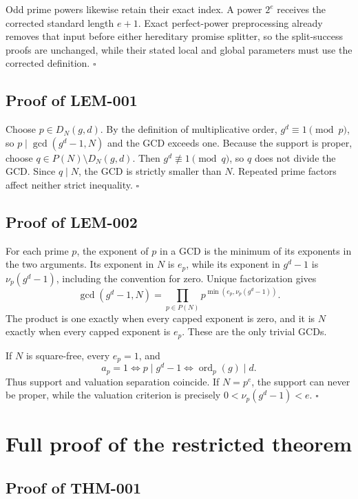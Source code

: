 \documentclass[11pt]{article}
\begin{document}
Odd prime powers likewise retain their exact index. A power \(2^e\) receives
the corrected standard length \(e+1\). Exact perfect-power preprocessing
already removes that input before either hereditary promise splitter, so the
split-success proofs are unchanged, while their stated local and global
parameters must use the corrected definition. \(\square\)

\subsection{Proof of LEM-001}\label{proof:LEM-001}

Choose \(p\in D_N(g,d)\). By the definition of multiplicative order,
\(g^d\equiv1\pmod p\), so \(p\mid\gcd(g^d-1,N)\) and the GCD exceeds one.
Because the support is proper, choose
\(q\in P(N)\setminus D_N(g,d)\). Then
\(g^d\not\equiv1\pmod q\), so \(q\) does not divide the GCD. Since \(q\mid N\),
the GCD is strictly smaller than \(N\). Repeated prime factors affect neither
strict inequality. \(\square\)

\subsection{Proof of LEM-002}\label{proof:LEM-002}

For each prime \(p\), the exponent of \(p\) in a GCD is the minimum of its
exponents in the two arguments. Its exponent in \(N\) is \(e_p\), while its
exponent in \(g^d-1\) is \(\nu_p(g^d-1)\), including the convention for zero.
Unique factorization gives
\[
\gcd(g^d-1,N)=
\prod_{p\in P(N)}p^{\min(e_p,\nu_p(g^d-1))}.
\]
The product is one exactly when every capped exponent is zero, and it is \(N\)
exactly when every capped exponent is \(e_p\). These are the only trivial
GCDs.

If \(N\) is square-free, every \(e_p=1\), and
\[
a_p=1
\Longleftrightarrow p\mid g^d-1
\Longleftrightarrow\operatorname{ord}_p(g)\mid d.
\]
Thus support and valuation separation coincide. If \(N=p^e\), the support can
never be proper, while the valuation criterion is precisely
\(0<\nu_p(g^d-1)<e\). \(\square\)

\section{Full proof of the restricted theorem}

\subsection{Proof of THM-001}\label{proof:THM-001}
\end{document}
